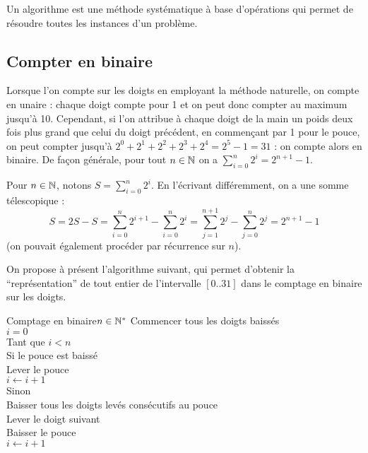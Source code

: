 	\begin{Definition}[algorithme]
		Un algorithme est une méthode systématique à base d'opérations qui permet de résoudre toutes les instances d'un problème.
	\end{Definition}
	
	
	\subsection{Compter en binaire}
	
		Lorsque l'on compte sur les doigts en employant la méthode naturelle, on compte en unaire : chaque doigt compte pour 1 et on peut donc compter au maximum jusqu'à 10. \nt
		Cependant, si l'on attribue à chaque doigt de la main un poids deux fois plus grand que celui du doigt précédent, en commençant par 1 pour le pouce, on peut compter jusqu'à \(2^0+2^1+2^2+2^3+2^4 = 2^5 - 1 = 31\) : on compte alors en binaire. \nll
		 De façon générale, pour tout \(n\in\mathbb{N}\) on a \(\displaystyle \sum_{i=0}^n 2^i = 2^{n+1} - 1\).
		
		\eqskip{2mm}
		\begin{Preuve}
			Pour \(n\in\mathbb{N}\), notons \(S = \displaystyle\sum\nolimits_{i=0}^n 2^i\). En l'écrivant différemment, on a une somme télescopique :
				\[
					S=2S-S = \sum_{i=0}^n 2^{i+1} - \sum_{i=0}^n 2^i = \sum_{j=1}^{n+1} 2^j - \sum_{j=0}^n 2^j = 2^{n+1} - 1
				\]
			(on pouvait également procéder par récurrence sur \(n\)).
		\end{Preuve}
	
		On propose à présent l'algorithme suivant, qui permet d'obtenir la ``représentation'' de tout entier de l'intervalle \([0..31]\) dans le comptage en binaire sur les doigts. 
			
			\begin{algo}{Comptage en binaire}{$n\in\mathbb{N}^*$}{}
				Commencer tous les doigts baissés \\
				\(i = 0\) \\
				Tant que \(i < n\) \\ \Indp
				Si le pouce est baissé \\ \Indp
				Lever le pouce \\
				\(i \gets i+1\) \\ \Indm
				Sinon \\ \Indp
				Baisser tous les doigts levés consécutifs au pouce \\
				Lever le doigt suivant \\
				Baisser le pouce \\
				\(i \gets i+1\)
			\end{algo}
		
